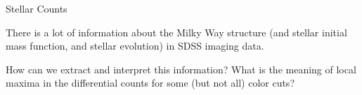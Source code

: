 \documentclass[letterpaper,landscape]{slides}
\begin{document}
\begin{slide}
     \begin{center}
        \begin{minipage}{7in}
            \phantom{x} \vskip -2.0in
            \phantom{x} \hskip -0.5in
            {}
        \end{minipage}
     \end{center}
     \vfill
\end{slide}





\begin{slide}
\begin{center}
{\large \color{red} 
                    Stellar Counts
}
\end{center}


There is a lot of information about the Milky Way structure (and stellar
initial mass function, and stellar evolution) in SDSS imaging data.

{\color{blue} 
How can we extract and interpret this information? What is the meaning
of local maxima in the differential counts for some (but not all) color
cuts? 
}
     
\vfill
\end{slide}
\end{document}
